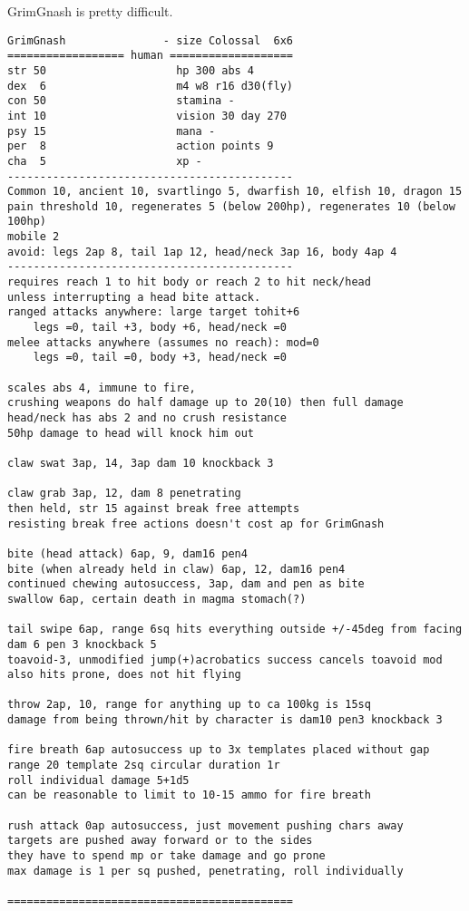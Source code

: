 \raggedbottom

GrimGnash is pretty difficult.


\goodbreak \small \begin{samepage} \begin{verbatim}
GrimGnash               - size Colossal  6x6
================== human ===================
str 50                    hp 300 abs 4
dex  6                    m4 w8 r16 d30(fly)
con 50                    stamina -
int 10                    vision 30 day 270
psy 15                    mana -
per  8                    action points 9
cha  5                    xp -
--------------------------------------------
Common 10, ancient 10, svartlingo 5, dwarfish 10, elfish 10, dragon 15
pain threshold 10, regenerates 5 (below 200hp), regenerates 10 (below 100hp)
mobile 2
avoid: legs 2ap 8, tail 1ap 12, head/neck 3ap 16, body 4ap 4
--------------------------------------------
requires reach 1 to hit body or reach 2 to hit neck/head
unless interrupting a head bite attack.
ranged attacks anywhere: large target tohit+6
    legs =0, tail +3, body +6, head/neck =0
melee attacks anywhere (assumes no reach): mod=0
    legs =0, tail =0, body +3, head/neck =0

scales abs 4, immune to fire, 
crushing weapons do half damage up to 20(10) then full damage
head/neck has abs 2 and no crush resistance
50hp damage to head will knock him out

claw swat 3ap, 14, 3ap dam 10 knockback 3

claw grab 3ap, 12, dam 8 penetrating
then held, str 15 against break free attempts
resisting break free actions doesn't cost ap for GrimGnash

bite (head attack) 6ap, 9, dam16 pen4 
bite (when already held in claw) 6ap, 12, dam16 pen4
continued chewing autosuccess, 3ap, dam and pen as bite
swallow 6ap, certain death in magma stomach(?)

tail swipe 6ap, range 6sq hits everything outside +/-45deg from facing
dam 6 pen 3 knockback 5
toavoid-3, unmodified jump(+)acrobatics success cancels toavoid mod
also hits prone, does not hit flying

throw 2ap, 10, range for anything up to ca 100kg is 15sq
damage from being thrown/hit by character is dam10 pen3 knockback 3

fire breath 6ap autosuccess up to 3x templates placed without gap
range 20 template 2sq circular duration 1r
roll individual damage 5+1d5
can be reasonable to limit to 10-15 ammo for fire breath

rush attack 0ap autosuccess, just movement pushing chars away
targets are pushed away forward or to the sides
they have to spend mp or take damage and go prone
max damage is 1 per sq pushed, penetrating, roll individually

============================================
\end{verbatim} \end{samepage} \normalsize

